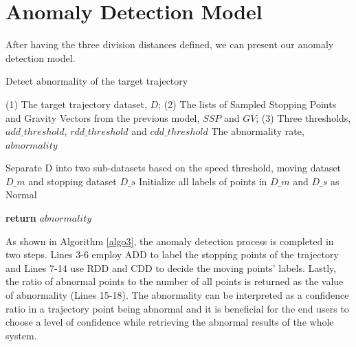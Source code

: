 \documentclass[12pt,glossary]{dalcsthesis}
\begin{document}
\section{Anomaly Detection Model}
\label{sec:anomaly_detection_model}

After having the three division distances defined, we can present our anomaly detection model. %

\begin{algorithm}
\caption{Detect abnormality of the target trajectory}
\label{algo3}
\begin{algorithmic}[1]
\Require (1) The target trajectory dataset, $D$; (2) The lists of Sampled Stopping Points and Gravity Vectors from the previous model, $SSP$ and $GV$; (3) Three thresholds, $add\_threshold$, $rdd\_threshold$ and $cdd\_threshold$
\Ensure The abnormality rate, $abnormality$

\State Separate D into two sub-datasets based on the speed threshold, moving dataset $D\_m$ and stopping dataset $D\_s$
\State Initialize all labels of points in $D\_m$ and $D\_s$ as Normal

    \EndIf
\EndFor

    \Else
        \EndIf
    \EndIf
\EndFor
{}

\State \textbf{return} $abnormality$
\end{algorithmic}
\end{algorithm}

As shown in Algorithm \ref{algo3}, the anomaly detection process is completed in two steps. Lines 3-6 employ ADD to label the stopping points of the trajectory and Lines 7-14 use RDD and CDD to decide the moving points' labels. Lastly, the ratio of abnormal points to the number of all points is returned as the value of abnormality (Lines 15-18). The abnormality can be interpreted as a confidence ratio in a trajectory point being abnormal and it is beneficial for the end users to  choose a level of confidence while retrieving the abnormal results of the whole system.
\end{document}
